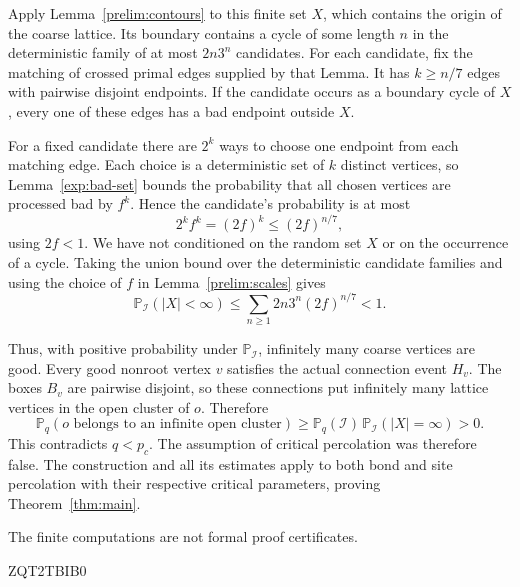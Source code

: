\documentclass[11pt]{article}
\theoremstyle{definition}
\theoremstyle{remark}
\numberwithin{equation}{section}
\begin{document}
Apply Lemma~\ref{prelim:contours} to this finite set $X$, which contains
the origin of the coarse lattice. Its boundary contains a cycle of
some length $n$ in the deterministic family of at most $2n3^n$
candidates. For each candidate, fix the matching of crossed primal
edges supplied by that Lemma. It has $k\ge n/7$ edges with pairwise
disjoint endpoints. If the candidate occurs as a boundary cycle of
$X$, every one of these edges has a bad endpoint outside $X$.

For a fixed candidate there are $2^k$ ways to choose one endpoint from
each matching edge. Each choice is a deterministic set of $k$ distinct
vertices, so Lemma~\ref{exp:bad-set} bounds the probability that all
chosen vertices are processed bad by $f^k$. Hence the candidate's
probability is at most
\[
 2^k f^k=(2f)^k\le(2f)^{n/7},
\]
using $2f<1$. We have not conditioned on the random set $X$ or on the
occurrence of a cycle. Taking the union bound over the deterministic
candidate families and using the choice of $f$ in
Lemma~\ref{prelim:scales} gives
\begin{equation}
 \mathbb P_{\mathcal I}(|X|<\infty)
 \le\sum_{n\ge1}2n3^n(2f)^{n/7}<1.
 \label{exp:infinite-good}
\end{equation}

Thus, with positive probability under $\mathbb P_{\mathcal I}$,
infinitely many coarse vertices are good. Every good nonroot vertex
$v$ satisfies the actual connection event $H_v$. The boxes $B_v$ are
pairwise disjoint, so these connections put infinitely many lattice
vertices in the open cluster of $o$. Therefore
\[
 \mathbb P_q(o\text{ belongs to an infinite open cluster})
 \ge \mathbb P_q(\mathcal I)\,
       \mathbb P_{\mathcal I}(|X|=\infty)>0.
\]
This contradicts $q<p_c$. The assumption of critical percolation was
therefore false. The construction and all its estimates apply to
both bond and site percolation with their respective critical
parameters, proving Theorem~\ref{thm:main}.

The finite computations are not formal proof certificates.



ZQT2TBIB0
\end{document}
